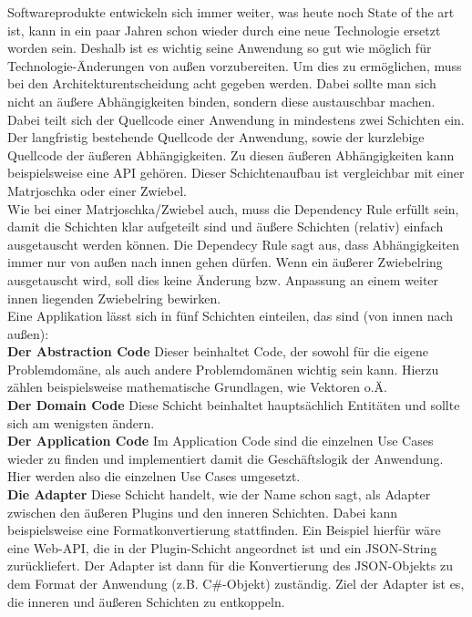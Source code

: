 Softwareprodukte entwickeln sich immer weiter, was heute noch State of the art ist, kann in ein paar Jahren schon wieder durch eine neue Technologie ersetzt worden sein. Deshalb ist es wichtig seine Anwendung so gut wie möglich für Technologie-Änderungen von außen vorzubereiten. Um dies zu ermöglichen, muss bei den Architekturentscheidung acht gegeben werden. Dabei sollte man sich nicht an äußere Abhängigkeiten binden, sondern diese austauschbar machen. Dabei teilt sich der Quellcode einer Anwendung in mindestens zwei Schichten ein. Der langfristig bestehende Quellcode der Anwendung, sowie der kurzlebige Quellcode der äußeren Abhängigkeiten. Zu diesen äußeren Abhängigkeiten kann beispielsweise eine API gehören. Dieser Schichtenaufbau ist vergleichbar mit einer Matrjoschka oder einer Zwiebel.\\

\noindent Wie bei einer Matrjoschka/Zwiebel auch, muss die Dependency Rule erfüllt sein, damit die Schichten klar aufgeteilt sind und äußere Schichten (relativ) einfach ausgetauscht werden können. Die Dependecy Rule sagt aus, dass Abhängigkeiten immer nur von außen nach innen gehen dürfen. Wenn ein äußerer Zwiebelring ausgetauscht wird, soll dies keine Änderung bzw. Anpassung an einem weiter innen liegenden Zwiebelring bewirken.\\

\noindent Eine Applikation lässt sich in fünf Schichten einteilen, das sind (von innen nach außen):\\

\noindent
{}
\textbf{Der Abstraction Code}
Dieser beinhaltet Code, der sowohl für die eigene Problemdomäne, als auch andere Problemdomänen wichtig sein kann. Hierzu zählen beispielsweise mathematische Grundlagen, wie Vektoren o.Ä.\\

\noindent
{}
\textbf{Der Domain Code}
Diese Schicht beinhaltet hauptsächlich Entitäten und sollte sich am wenigsten ändern.\\

\noindent
{}
\textbf{Der Application Code}
Im Application Code sind die einzelnen Use Cases wieder zu finden und implementiert damit die Geschäftslogik der Anwendung. Hier werden also die einzelnen Use Cases umgesetzt.\\

\noindent
{}
\textbf{Die Adapter}
Diese Schicht handelt, wie der Name schon sagt, als Adapter zwischen den äußeren Plugins und den inneren Schichten. Dabei kann beispielsweise eine Formatkonvertierung stattfinden. Ein Beispiel hierfür wäre eine Web-API, die in der Plugin-Schicht angeordnet ist und ein JSON-String zurückliefert. Der Adapter ist dann für die Konvertierung des JSON-Objekts zu dem Format der Anwendung (z.B. C\#-Objekt) zuständig. Ziel der Adapter ist es, die inneren und äußeren Schichten zu entkoppeln.\\


